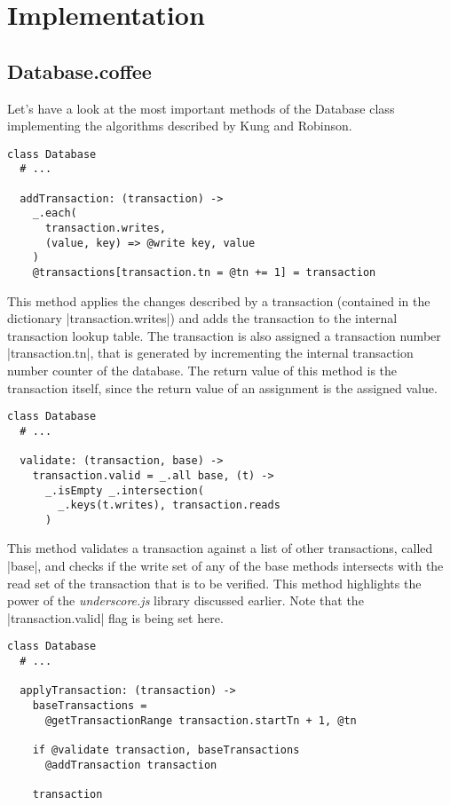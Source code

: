 
\chapter{Implementation}

\section{Database.coffee}

Let's have a look at the most important methods of the Database class
implementing the algorithms described by Kung and Robinson.

\begin{verbatim}
class Database
  # ...

  addTransaction: (transaction) ->
    _.each(
      transaction.writes,
      (value, key) => @write key, value
    )
    @transactions[transaction.tn = @tn += 1] = transaction
\end{verbatim}

This method applies the changes described by a transaction (contained in the
dictionary |transaction.writes|) and adds the transaction to the internal
transaction lookup table. The transaction is also assigned a transaction number
|transaction.tn|, that is generated by incrementing the internal transaction
number counter of the database. The return value of this method is the
transaction itself, since the return value of an assignment is the assigned
value.

\begin{verbatim}
class Database
  # ...

  validate: (transaction, base) ->
    transaction.valid = _.all base, (t) ->
      _.isEmpty _.intersection(
        _.keys(t.writes), transaction.reads
      )
\end{verbatim}

This method validates a transaction against a list of other transactions, called
|base|, and checks if the write set of any of the base methods intersects with
the read set of the transaction that is to be verified. This method highlights
the power of the \emph{underscore.js} library discussed earlier. Note that
the |transaction.valid| flag is being set here.

\begin{verbatim}
class Database
  # ...

  applyTransaction: (transaction) ->
    baseTransactions =
      @getTransactionRange transaction.startTn + 1, @tn

    if @validate transaction, baseTransactions
      @addTransaction transaction

    transaction
\end{verbatim}

